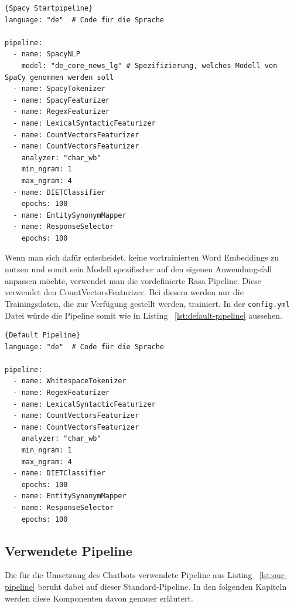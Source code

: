 \begin{lstlisting}[label={lst:spacy-pipeline},caption={Spacy Startpipeline}]{Spacy Startpipeline}
language: "de"  # Code für die Sprache

pipeline:
  - name: SpacyNLP
    model: "de_core_news_lg" # Spezifizierung, welches Modell von SpaCy genommen werden soll
  - name: SpacyTokenizer
  - name: SpacyFeaturizer
  - name: RegexFeaturizer
  - name: LexicalSyntacticFeaturizer
  - name: CountVectorsFeaturizer
  - name: CountVectorsFeaturizer
    analyzer: "char_wb"
    min_ngram: 1
    max_ngram: 4
  - name: DIETClassifier
    epochs: 100
  - name: EntitySynonymMapper
  - name: ResponseSelector
    epochs: 100

\end{lstlisting}

Wenn man sich dafür entscheidet, keine vortrainierten Word Embeddings zu nutzen und somit sein Modell spezifischer auf den eigenen Anwendungsfall anpassen möchte, verwendet man die vordefinierte Rasa Pipeline.
Diese verwendet den CountVectorsFeaturizer.
Bei diesem werden nur die Trainingsdaten, die zur Verfügung gestellt werden, trainiert.\cite{startingPipelines, allComponents, nluExamples}
In der \texttt{config.yml} Datei würde die Pipeline somit wie in Listing ~\ref{lst:default-pipeline} aussehen.

\begin{lstlisting}[label={lst:default-pipeline},caption={Default Pipeline}]{Default Pipeline}
language: "de"  # Code für die Sprache

pipeline:
  - name: WhitespaceTokenizer
  - name: RegexFeaturizer
  - name: LexicalSyntacticFeaturizer
  - name: CountVectorsFeaturizer
  - name: CountVectorsFeaturizer
    analyzer: "char_wb"
    min_ngram: 1
    max_ngram: 4
  - name: DIETClassifier
    epochs: 100
  - name: EntitySynonymMapper
  - name: ResponseSelector
    epochs: 100

\end{lstlisting}

\subsection{Verwendete Pipeline}\label{subsec:our-pipeline}

Die für die Umsetzung des Chatbots verwendete Pipeline aus Listing ~\ref{lst:our-pipeline} beruht dabei auf dieser Standard-Pipeline.
In den folgenden Kapiteln werden diese Komponenten davon genauer erläutert.

